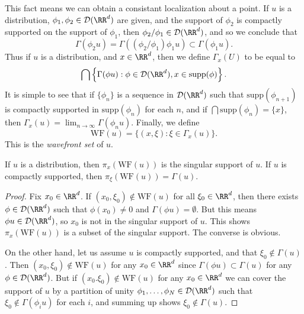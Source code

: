This fact means we can obtain a consistant localization about a point. If $u$ is a distribution, $\phi_1,\phi_2 \in \mathcal{D}(\RR^d)$ are given, and the support of $\phi_2$ is compactly supported on the support of $\phi_1$, then $\phi_2/\phi_1 \in \mathcal{D}(\RR^d)$, and so we conclude that
%
\[ \Gamma(\phi_2 u) = \Gamma((\phi_2/\phi_1) \phi_1 u) \subset \Gamma(\phi_1 u). \]
%
Thus if $u$ is a distribution, and $x \in \RR^d$, then we define $\Gamma_x(U)$ to be equal to
%
\[ \bigcap \left\{ \Gamma(\phi u) : \phi \in \mathcal{D}(\RR^d), x \in \text{supp}(\phi) \right\}. \]
%
It is simple to see that if $\{ \phi_n \}$ is a sequence in $\mathcal{D}(\RR^d)$ such that $\text{supp}(\phi_{n+1})$ is compactly supported in $\text{supp}(\phi_n)$ for each $n$, and if $\bigcap \text{supp}(\phi_n) = \{ x \}$, then $\Gamma_x(u) = \lim_{n \to \infty} \Gamma(\phi_n u)$. Finally, we define
%
\[ \text{WF}(u) = \{ (x,\xi): \xi \in \Gamma_x(u) \}. \]
%
This is the \emph{wavefront set} of $u$.

\begin{lemma}
    If $u$ is a distribution, then $\pi_x(\text{WF}(u))$ is the singular support of $u$. If $u$ is compactly supported, then $\pi_\xi(\text{WF}(u)) = \Gamma(u)$.
\end{lemma}
\begin{proof}
    Fix $x_0 \in \RR^d$. If $(x_0,\xi_0) \not \in \text{WF}(u)$ for all $\xi_0 \in \RR^d$, then there exists $\phi \in \mathcal{D}(\RR^d)$ such that $\phi(x_0) \neq 0$ and $\Gamma(\phi u) = \emptyset$. But this means $\phi u \in \mathcal{D}(\RR^d)$, so $x_0$ is not in the singular support of $u$. This shows $\pi_x(\text{WF}(u))$ is a subset of the singular support. The converse is obvious.

    On the other hand, let us assume $u$ is compactly supported, and that $\xi_0 \not \in \Gamma(u)$. Then $(x_0,\xi_0) \not \in \text{WF}(u)$ for any $x_0 \in \RR^d$ since $\Gamma(\phi u) \subset \Gamma(u)$ for any $\phi \in \mathcal{D}(\RR^d)$. But if $(x_0.\xi_0) \not \in \text{WF}(u)$ for any $x_0 \in \RR^d$ we can cover the support of $u$ by a partition of unity $\phi_1,\dots,\phi_N \in \mathcal{D}(\RR^d)$ such that $\xi_0 \not \in \Gamma(\phi_i u)$ for each $i$, and summing up shows $\xi_0 \not \in \Gamma(u)$.
\end{proof}

